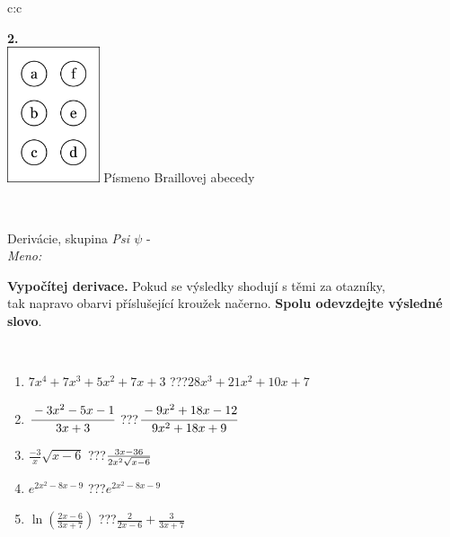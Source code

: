 \documentclass[10pt]{report}
\begin{document}
\begin{tabular}{c:c}
\begin{minipage}[c][104.5mm][t]{0.5\linewidth}
\begin{center}
\begin{minipage}{0.20\linewidth}
\begin{center}
{\Huge\bfseries 2.} \\[2mm]
\includegraphics[height=40mm]{../images/braille.png}
{\small Písmeno Braillovej abecedy}
\end{center}
\end{minipage}
\end{center}
\end{minipage}
\\ \hdashline
\begin{minipage}[c][104.5mm][t]{0.5\linewidth}
\begin{center}
\vspace{7mm}
{\huge Derivácie, skupina \textit{Psi $\psi$} -}\\[5mm]
\textit{Meno:}\phantom{xxxxxxxxxxxxxxxxxxxxxxxxxxxxxxxxxxxxxxxxxxxxxxxxxxxxxxxxxxxxxxxxx}\\[5mm]
\begin{minipage}{0.95\linewidth}
\begin{center}
\textbf{Vypočítej derivace.} Pokud se výsledky shodují s těmi za otazníky,\\tak napravo obarvi příslušející kroužek načerno. \textbf{Spolu odevzdejte výsledné slovo}.
\end{center}
\end{minipage}
\\[1mm]
\begin{minipage}{0.79\linewidth}
\begin{center}
\begin{varwidth}{\linewidth}
\begin{enumerate}
\normalsize
\item $7x^4+7x^3+5x^2+7x+3$\quad \dotfill\; ???\;\dotfill \quad $28x^3+21x^2+10x+7$
\item $\cfrac{-3x^2-5x-1}{3x+3}$\quad \dotfill\; ???\;\dotfill \quad $\cfrac{-9x^2+18x-12}{9x^2+18x+9}$
\item $\frac{-3}{x}\sqrt{x-6}$\quad \dotfill\; ???\;\dotfill \quad $\frac{3x-36}{2x^2 \sqrt{\smash[b]{x-6}}}$
\item $e^{2x^2-8x-9}$\quad \dotfill\; ???\;\dotfill \quad $e^{2x^2-8x-9}$
\item $\ln{\left(\frac{2x-6}{3x+7}\right)}$\quad \dotfill\; ???\;\dotfill \quad $\frac{2}{2x-6}+\frac{3}{3x+7}$

\end{enumerate}
\end{varwidth}
\end{center}
\end{minipage}
\end{center}
\end{minipage}
\end{tabular}
\end{document}
